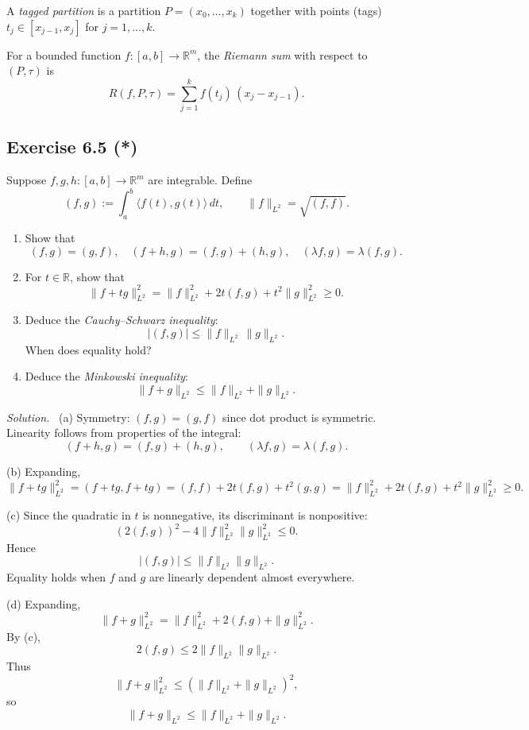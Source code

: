 \documentclass[11pt,a4paper]{article}
\newenvironment{solution}{\par\noindent\textit{Solution.}\ }{\par\vspace{0.5em}}
\begin{document}
A \emph{tagged partition} is a partition $P=(x_0,\dots,x_k)$ together with 
points (tags) $t_j\in[x_{j-1},x_j]$ for $j=1,\dots,k$.

For a bounded function $f:[a,b]\to\mathbb{R}^m$, the \emph{Riemann sum} with 
respect to $(P,\tau)$ is
\[
R(f,P,\tau)=\sum_{j=1}^k f(t_j)\,(x_j-x_{j-1}).
\]

\subsection*{Exercise 6.5 (*)}
Suppose $f,g,h:[a,b]\to\mathbb{R}^m$ are integrable. Define
\[
(f,g) := \int_a^b \langle f(t),g(t)\rangle \, dt, 
\qquad 
\|f\|_{L^2} = \sqrt{(f,f)}.
\]

\begin{enumerate}[label=\alph*)]
	\item Show that
	\[
	(f,g)=(g,f), \quad (f+h,g)=(f,g)+(h,g), \quad (\lambda f,g)=\lambda(f,g).
	\]
	
	\item For $t\in\mathbb{R}$, show that
	\[
	\|f+tg\|_{L^2}^2 = \|f\|_{L^2}^2 + 2t(f,g) + t^2\|g\|_{L^2}^2 \geq 0.
	\]
	
	\item Deduce the \emph{Cauchy--Schwarz inequality}:
	\[
	|(f,g)| \leq \|f\|_{L^2}\,\|g\|_{L^2}.
	\]
	When does equality hold?
	
	\item Deduce the \emph{Minkowski inequality}:
	\[
	\|f+g\|_{L^2} \leq \|f\|_{L^2}+\|g\|_{L^2}.
	\]
\end{enumerate}

\begin{solution}
	(a) Symmetry: $(f,g)=(g,f)$ since dot product is symmetric. Linearity follows 
	from properties of the integral:
	\[
	(f+h,g)=(f,g)+(h,g), \qquad (\lambda f,g)=\lambda(f,g).
	\]
	
	(b) Expanding,
	\[
	\|f+tg\|_{L^2}^2 = (f+tg,f+tg)
	= (f,f)+2t(f,g)+t^2(g,g)
	=\|f\|_{L^2}^2+2t(f,g)+t^2\|g\|_{L^2}^2\geq 0.
	\]
	
	(c) Since the quadratic in $t$ is nonnegative, its discriminant is nonpositive:
	\[
	(2(f,g))^2 - 4\|f\|_{L^2}^2\|g\|_{L^2}^2 \leq 0.
	\]
	Hence
	\[
	|(f,g)| \leq \|f\|_{L^2}\|g\|_{L^2}.
	\]
	Equality holds when $f$ and $g$ are linearly dependent almost everywhere.
	
	(d) Expanding,
	\[
	\|f+g\|_{L^2}^2 = \|f\|_{L^2}^2 + 2(f,g) + \|g\|_{L^2}^2.
	\]
	By (c),
	\[
	2(f,g) \leq 2\|f\|_{L^2}\|g\|_{L^2}.
	\]
	Thus
	\[
	\|f+g\|_{L^2}^2 \leq (\|f\|_{L^2}+\|g\|_{L^2})^2,
	\]
	so
	\[
	\|f+g\|_{L^2} \leq \|f\|_{L^2}+\|g\|_{L^2}.
	\]
\end{solution}
\end{document}
